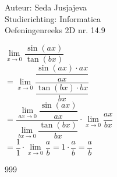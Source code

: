 \documentclass[a4paper]{article}
\begin{document}
\noindent \large Auteur: Seda Jusjajeva\\
\noindent \large Studierichting: Informatica\\
\noindent \large Oefeningenreeks 2D nr. 14.9 \\

\medskip

\normalsize


$\lim\limits_{x\rightarrow 0} \dfrac{\sin(ax)}{\tan(bx)}$ \\

$= \lim\limits_{x\rightarrow 0} \dfrac{\dfrac{\sin(ax) \cdot ax}{ax}}{\dfrac{\tan(bx)\cdot bx}{bx}}$ \\

$= \dfrac{\lim\limits_{ax\rightarrow 0} \dfrac{\sin(ax)}{ax}}{\lim\limits_{bx\rightarrow 0} \dfrac{\tan(bx)}{bx}} 
\cdot \lim\limits_{x\rightarrow 0} \dfrac{ax}{bx}$ \\

$= \dfrac{1}{1}\cdot\lim\limits_{x\rightarrow 0}\dfrac{a}{b} = 1\cdot\dfrac{a}{b} = \dfrac{a}{b}$ \\




\begin{thebibliography}{999}
\end{thebibliography}
\end{document}
